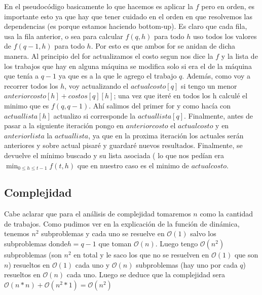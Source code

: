 \documentclass[A4paper,oneside,fleqn,11pt]{article}
\theoremstyle{definition}
\begin{document}
En el pseudocódigo basicamente lo que hacemos es aplicar la $f$ pero en orden, es importante esto ya que hay que tener cuidado en el orden en que resolvemos las dependencias (es porque estamos haciendo bottom-up). Es claro que cada fila, usa la fila anterior, o sea para calcular $f(q,h)$ para todo $h$ uso todos los valores de $f(q-1,h)$ para todo $h$. Por esto es que ambos for se anidan de dicha manera. Al principio del for actualizamos el costo segun nos dice la $f$ y la lista de los trabajos que hay en alguna máquina se modifica solo si era el de la máquina que tenía a $q-1$ ya que es a la que le agrego el trabajo $q$. Además, como voy a recorrer todos los $h$, voy actualizando el $actualcosto[q]$ si tengo un menor $anteriorcosto[h]+costos[q][h]$; una vez que iteré en todos los h calculé el minimo que es $f(q,q-1)$. Ahí salimos del primer for y como hacía con $actuallista[h]$ actualizo si corresponde la $actuallista[q]$. Finalmente, antes de pasar a la siguiente iteración pongo en $anteriorcosto$ el $actualcosto$ y en $ anteriorlista$ la $actuallista$, ya que en la proxima iteración los actuales serán anteriores y sobre actual pisaré y guardaré nuevos resultados. Finalmente, se devuelve el mínimo buscado y su lista asociada ( lo que nos pedían era $\displaystyle \min_{0 \leq h \leq t-1} {f(t,h)}  $ que en nuestro caso es el minimo de $actualcosto$.



\subsection{Complejidad}

Cabe aclarar que para el análisis de complejidad tomaremos $n$ como la cantidad de trabajos. Como pudimos ver en la explicación de la función de dinámica, tenemos $n^2$ subproblemas y cada uno se resuelve en  $\mathcal{O}(1)$ salvo los subproblemas donde$ h=q-1$ que toman $\mathcal{O}(n)$. Luego tengo $\mathcal{O}(n^2)$ subproblemas (son $n^2$ en total y le saco los que no se resuelven en $\mathcal{O}(1)$ que son $n$)  resueltos en $\mathcal{O}(1)$ cada uno y $\mathcal{O}(n)$ subproblemas (hay uno por cada $q$) resueltos en $\mathcal{O}(n)$ cada uno. Luego se deduce que la complejidad sera $\mathcal{O}(n*n)+\mathcal{O}(n^2 *1)=\mathcal{O}(n^2)$
\end{document}
